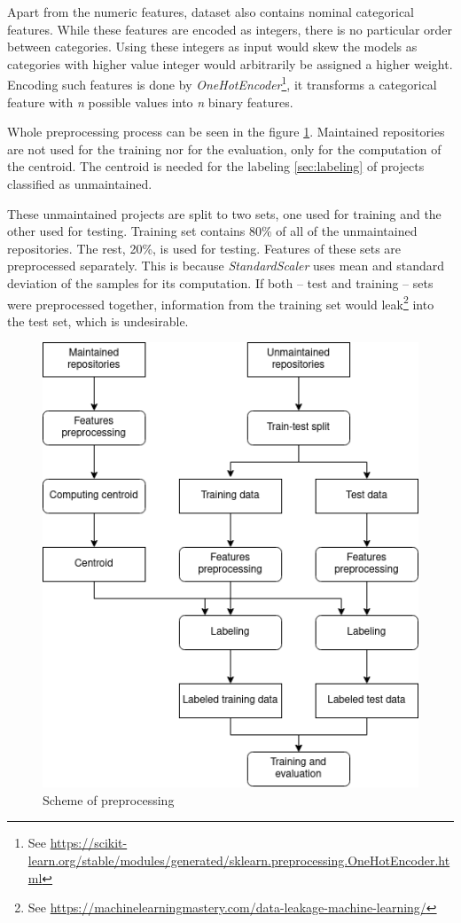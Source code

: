Apart from the numeric features, dataset also contains nominal categorical features.
While these features are encoded as integers, there is no particular order between categories.
Using these integers as input would skew the models as categories with higher value integer would arbitrarily be assigned a higher weight.
Encoding such features is done by \emph{OneHotEncoder}\footnote{See \url{https://scikit-learn.org/stable/modules/generated/sklearn.preprocessing.OneHotEncoder.html}}, it transforms a categorical feature with \emph{n} possible values into \emph{n} binary features.

Whole preprocessing process can be seen in the figure \ref{fig:preprocessing}.
Maintained repositories are not used for the training nor for the evaluation, only for the computation of the centroid.
The centroid is needed for the labeling \ref{sec:labeling} of projects classified as unmaintained.

These unmaintained projects are split to two sets, one used for training and the other used for testing.
Training set contains 80\% of all of the unmaintained repositories.
The rest, 20\%, is used for testing.
Features of these sets are preprocessed separately.
This is because \emph{StandardScaler} uses mean and standard deviation of the samples for its computation.
If both -- test and training -- sets were preprocessed together, information from the training set would leak\footnote{See \url{https://machinelearningmastery.com/data-leakage-machine-learning/}} into the test set, which is undesirable.

\begin{figure}
    \centering
    \includegraphics[scale=0.8]{chapters/chapter3/preprocessing.png}
    \caption{Scheme of preprocessing}
    \label{fig:preprocessing}
\end{figure}

